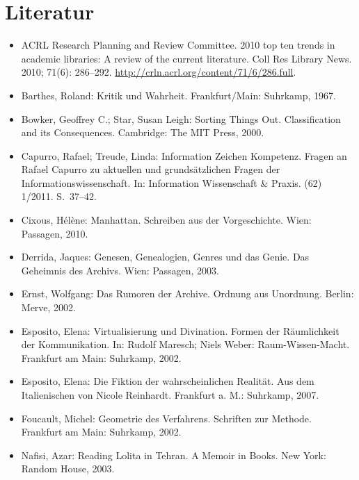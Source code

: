 \documentclass[output=paper]{langscibook}
\begin{document}
\hypertarget{literatur}{%
\section*{Literatur}\label{literatur}}
\begin{itemize}

\item ACRL Research Planning and Review Committee. 2010 top ten trends in academic libraries: A review of the current literature. Coll Res Library News. 2010; 71(6): 286--292. \url{http://crln.acrl.org/content/71/6/286.full}.

\item Barthes, Roland: Kritik und Wahrheit. Frankfurt/Main: Suhrkamp, 1967.

\item Bowker, Geoffrey C.; Star, Susan Leigh: Sorting Things Out. Classification and its Consequences. Cambridge: The MIT Press, 2000.

\item Capurro, Rafael; Treude, Linda: Information Zeichen Kompetenz. Fragen an Rafael Capurro zu aktuellen und grundsätzlichen Fragen der Informationswissenschaft. In: Information Wissenschaft \& Praxis. (62) 1/2011. S.~37--42.

\item Cixous, Hélène: Manhattan. Schreiben aus der Vorgeschichte. Wien: Passagen, 2010.

\item Derrida, Jaques: Genesen, Genealogien, Genres und das Genie. Das Geheimnis des Archivs. Wien: Passagen, 2003.

\item Ernst, Wolfgang: Das Rumoren der Archive. Ordnung aus Unordnung. Berlin: Merve, 2002.

\item Esposito, Elena: Virtualisierung und Divination. Formen der Räumlichkeit der Kommunikation. In: Rudolf Maresch; Niels Weber: Raum-Wissen-Macht. Frankfurt am Main: Suhrkamp, 2002.

\item Esposito, Elena: Die Fiktion der wahrscheinlichen Realität. Aus dem Italienischen von Nicole Reinhardt. Frankfurt a. M.: Suhrkamp, 2007.

\item Foucault, Michel: Geometrie des Verfahrens. Schriften zur Methode. Frankfurt am Main: Suhrkamp, 2002.

\item Nafisi, Azar: Reading Lolita in Tehran. A Memoir in Books. New York: Random House, 2003.


\end{itemize}
\end{document}
